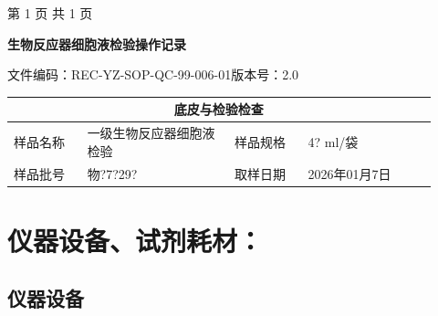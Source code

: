 \documentclass[UTF8,10pt,a4paper,fontset=fandol]{ctexart}
\newcommand{\fieldvalue}[1]{#1}
\newcommand{\handwritten}[1]{#1}
\begin{document}
\begin{center}
第 1 页 共 1 页
\end{center}

\newpage

\begin{center}
\textbf{生物反应器细胞液检验操作记录}

\vspace{0.5em}
文件编码：REC-YZ-SOP-QC-99-006-01\hspace{2em}版本号：2.0
\end{center}

\begin{tabular}{|p{0.16\linewidth}|p{0.32\linewidth}|p{0.16\linewidth}|p{0.28\linewidth}|}
\hline
\multicolumn{4}{|c|}{\textbf{底皮与检验检查}}\\
\hline
样品名称 &
\fieldvalue{一级生物反应器细胞液检验}
&
样品规格 &
\fieldvalue{\handwritten{4? ml/袋}}\\
\hline
样品批号 &
\fieldvalue{\handwritten{物?7?29?}}
&
取样日期 &
\fieldvalue{\handwritten{2026年01月7日}}\\
\hline
\end{tabular}

\section{仪器设备、试剂耗材：}

\subsection{仪器设备}
\end{document}
